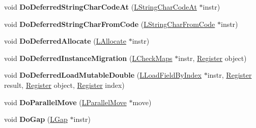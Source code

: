\begin{DoxyCompactItemize}
\item 
void {\bfseries Do\+Deferred\+String\+Char\+Code\+At} (\hyperlink{classv8_1_1internal_1_1_l_string_char_code_at}{L\+String\+Char\+Code\+At} $\ast$instr)\hypertarget{classv8_1_1internal_1_1_l_code_gen_a6b229168338a73ef11c203f845b68cb4}{}\label{classv8_1_1internal_1_1_l_code_gen_a6b229168338a73ef11c203f845b68cb4}

\item 
void {\bfseries Do\+Deferred\+String\+Char\+From\+Code} (\hyperlink{classv8_1_1internal_1_1_l_string_char_from_code}{L\+String\+Char\+From\+Code} $\ast$instr)\hypertarget{classv8_1_1internal_1_1_l_code_gen_acf78c92290237e368a4b178f049afbc6}{}\label{classv8_1_1internal_1_1_l_code_gen_acf78c92290237e368a4b178f049afbc6}

\item 
void {\bfseries Do\+Deferred\+Allocate} (\hyperlink{classv8_1_1internal_1_1_l_allocate}{L\+Allocate} $\ast$instr)\hypertarget{classv8_1_1internal_1_1_l_code_gen_a5a708933d9b086e295c8bf902f66033e}{}\label{classv8_1_1internal_1_1_l_code_gen_a5a708933d9b086e295c8bf902f66033e}

\item 
void {\bfseries Do\+Deferred\+Instance\+Migration} (\hyperlink{classv8_1_1internal_1_1_l_check_maps}{L\+Check\+Maps} $\ast$instr, \hyperlink{structv8_1_1internal_1_1_register}{Register} object)\hypertarget{classv8_1_1internal_1_1_l_code_gen_a9a11a557dc4a35165efe7432b91cce0c}{}\label{classv8_1_1internal_1_1_l_code_gen_a9a11a557dc4a35165efe7432b91cce0c}

\item 
void {\bfseries Do\+Deferred\+Load\+Mutable\+Double} (\hyperlink{classv8_1_1internal_1_1_l_load_field_by_index}{L\+Load\+Field\+By\+Index} $\ast$instr, \hyperlink{structv8_1_1internal_1_1_register}{Register} result, \hyperlink{structv8_1_1internal_1_1_register}{Register} object, \hyperlink{structv8_1_1internal_1_1_register}{Register} index)\hypertarget{classv8_1_1internal_1_1_l_code_gen_a9a814347358bb30ae26293358697e12f}{}\label{classv8_1_1internal_1_1_l_code_gen_a9a814347358bb30ae26293358697e12f}

\item 
void {\bfseries Do\+Parallel\+Move} (\hyperlink{classv8_1_1internal_1_1_l_parallel_move}{L\+Parallel\+Move} $\ast$move)\hypertarget{classv8_1_1internal_1_1_l_code_gen_ac76d169118f379bb8eb597ec360ca6e1}{}\label{classv8_1_1internal_1_1_l_code_gen_ac76d169118f379bb8eb597ec360ca6e1}

\item 
void {\bfseries Do\+Gap} (\hyperlink{classv8_1_1internal_1_1_l_gap}{L\+Gap} $\ast$instr)\hypertarget{classv8_1_1internal_1_1_l_code_gen_a349f26d8f5d21ea5ef25e7855317a575}{}\label{classv8_1_1internal_1_1_l_code_gen_a349f26d8f5d21ea5ef25e7855317a575}


\end{DoxyCompactItemize}
